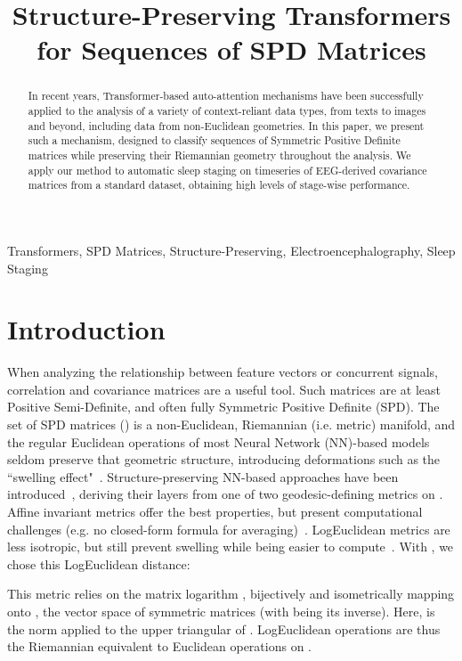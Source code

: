 \documentclass{article}
\title{Structure-Preserving Transformers for Sequences of SPD Matrices}
\begin{document}
\maketitle

\begin{abstract}
In recent years, Transformer-based auto-attention mechanisms have been successfully applied to the analysis of a variety of context-reliant data types, from texts to images and beyond, including data from non-Euclidean geometries. In this paper, we present such a mechanism, designed to classify sequences of Symmetric Positive Definite matrices while preserving their Riemannian geometry throughout the analysis. We apply our method to automatic sleep staging on timeseries of EEG-derived covariance matrices from a standard dataset, obtaining high levels of stage-wise performance.
\end{abstract}

\begin{keywords}
Transformers, SPD Matrices, Structure-Preserving, Electroencephalography, Sleep Staging
\end{keywords}

\section{Introduction}
\label{sec:intro}

When analyzing the relationship between feature vectors or concurrent signals, correlation and covariance matrices are a useful tool. Such matrices are at least Positive Semi-Definite, and often fully Symmetric Positive Definite (SPD).
The set of  SPD matrices () is a non-Euclidean, Riemannian (i.e. metric) manifold, and the regular Euclidean operations of most Neural Network (NN)-based models seldom preserve that geometric structure, introducing deformations such as the ``swelling effect"~\cite{LogEuclidean}.
Structure-preserving NN-based approaches have been introduced~\cite{huang2017spdnet,manifoldnet}, deriving their layers from one of two geodesic-defining metrics on . Affine invariant metrics offer the best properties, but present computational challenges (e.g. no closed-form formula for averaging)~\cite{affine_invariant}. 
LogEuclidean metrics are less isotropic, but still prevent swelling while being easier to compute~\cite{LogEuclidean}. With , we chose this LogEuclidean distance:

This metric relies on the matrix logarithm , bijectively and isometrically mapping  onto , the vector space of  symmetric matrices (with  being its inverse).
Here,  is the  norm applied to the upper triangular of .
LogEuclidean operations are thus the Riemannian equivalent to Euclidean operations on .
\end{document}
